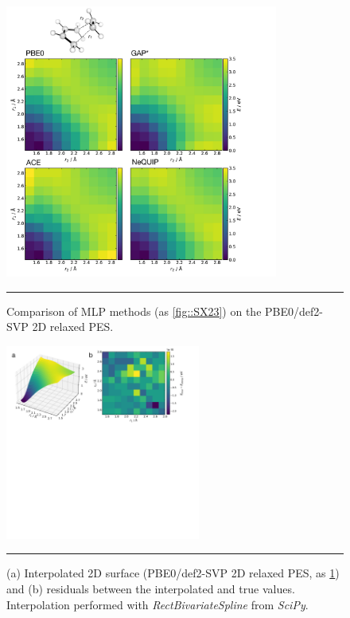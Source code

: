 \documentclass[11pt]{article}
\numberwithin{equation}{subsection}
\begin{document}
\begin{figure}[h!]
	\centering
	\includegraphics[width=0.8\textwidth]{figSX25.pdf}
	\vspace{0.2cm}
	\hrule
	\vspace{0.1cm}
	\caption{Comparison of MLP methods (as \figurename{ \ref{fig::SX23}}) on the PBE0/def2-SVP 2D relaxed PES.}
	\label{fig::SX25}
\end{figure}


\begin{figure}[h!]
	\centering
	\includegraphics[height=6.4cm]{figSX26.pdf}
	\vspace{0.2cm}
	\hrule
	\vspace{0.1cm}
	\caption{(a) Interpolated 2D surface (PBE0/def2-SVP 2D relaxed PES, as \figurename{ \ref{fig::SX25}}) and (b) residuals between the interpolated and true values. Interpolation performed with \emph{RectBivariateSpline} from \emph{SciPy}.}
	\label{fig::SX26}
\end{figure}
\end{document}
